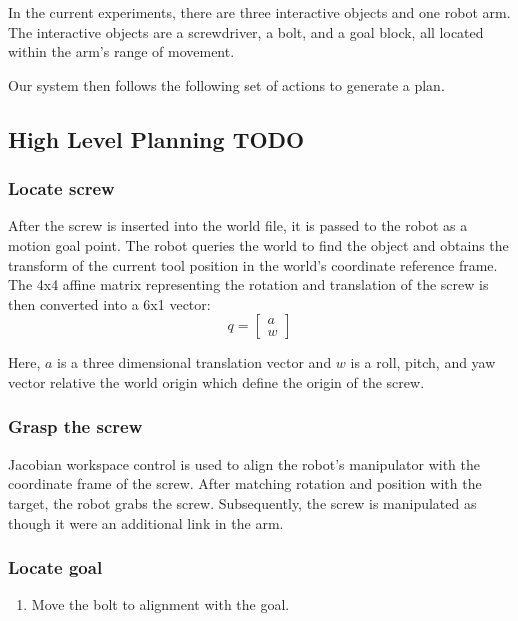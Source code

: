 \documentclass[10pt, conference]{IEEEtran}
\begin{document}
  In the current experiments, there are three interactive objects and
  one robot arm. The interactive objects are a screwdriver, a bolt, and
  a goal block, all located within the arm's range of movement.

  Our system then follows the following set of actions to generate a
  plan.
\subsection{High Level Planning TODO}
\label{sec-3-2}
\subsubsection{Locate screw}
\label{sec-3-2-1}

    After the screw is inserted into the world file, it is passed to the
    robot as a motion goal point. The robot queries the world to find the
    object and obtains the transform of the current tool position in the
    world's coordinate reference frame. The 4x4 affine matrix
    representing the rotation and translation of the screw is then
    converted into a 6x1 vector:
    \begin{equation}
    q = \begin{bmatrix}
                a \\
                w
              \end{bmatrix}
    \end{equation}

    Here, \(a\) is a three dimensional translation vector and \(w\)
    is a roll, pitch, and yaw vector relative the world origin which
    define the origin of the screw.
\subsubsection{Grasp the screw}
\label{sec-3-2-2}

    Jacobian workspace control is used to align the robot's manipulator
    with the coordinate frame of the screw. After matching rotation and
    position with the target, the robot grabs the screw. Subsequently,
    the screw is manipulated as though it were an additional link in the
    arm.
\subsubsection{Locate goal}
\label{sec-3-2-3}

\begin{enumerate}
\item Move the bolt to alignment with the goal.
\end{enumerate}
\end{document}
